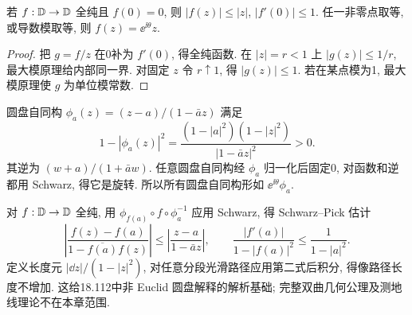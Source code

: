 \begin{theorem}[Schwarz]\label{thm:schwarz}
若 $f:\mathbb D\to\mathbb D$ 全纯且 $f(0)=0$, 则 $|f(z)|\le|z|$, $|f'(0)|\le1$. 任一非零点取等, 或导数模取等, 则 $f(z)=\ee^{\ii\theta}z$.
\end{theorem}
\begin{proof}
把 $g=f/z$ 在0补为 $f'(0)$, 得全纯函数. 在 $|z|=r<1$ 上 $|g(z)|\le1/r$, 最大模原理给内部同一界. 对固定 $z$ 令 $r\uparrow1$, 得 $|g(z)|\le1$. 若在某点模为1, 最大模原理使 $g$ 为单位模常数.
\end{proof}
圆盘自同构 $\phi_a(z)=(z-a)/(1-\bar az)$ 满足
\[
1-|\phi_a(z)|^2=\frac{(1-|a|^2)(1-|z|^2)}{|1-\bar az|^2}>0.
\]
其逆为 $(w+a)/(1+\bar aw)$. 任意圆盘自同构经 $\phi_a$ 归一化后固定0, 对函数和逆都用 Schwarz, 得它是旋转. 所以所有圆盘自同构形如 $\ee^{\ii\theta}\phi_a$.

对 $f:\mathbb D\to\mathbb D$ 全纯, 用 $\phi_{f(a)}\circ f\circ\phi_a^{-1}$ 应用 Schwarz, 得 Schwarz--Pick 估计
\[
\left|\frac{f(z)-f(a)}{1-\overline{f(a)}f(z)}\right|
\le\left|\frac{z-a}{1-\bar az}\right|,\qquad
\frac{|f'(a)|}{1-|f(a)|^2}\le\frac1{1-|a|^2}.
\]
定义长度元 $|\dd z|/(1-|z|^2)$, 对任意分段光滑路径应用第二式后积分, 得像路径长度不增加. 这给18.112中非 Euclid 圆盘解释的解析基础; 完整双曲几何公理及测地线理论不在本章范围.

